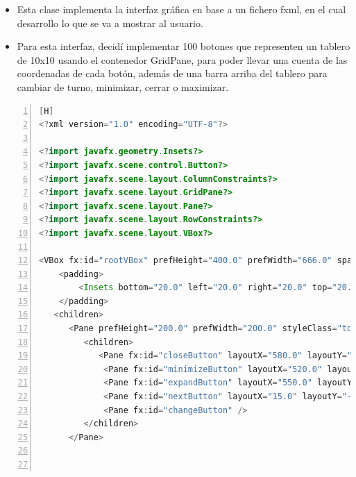 \documentclass{article}
\begin{document}
	\begin{itemize}	
		\item Esta clase implementa la interfaz gráfica en base a un fichero fxml, en el cual desarrollo lo que se va a mostrar al usuario.
		\item Para esta interfaz, decidí implementar 100 botones que representen un tablero de 10x10 usando el contenedor GridPane, para poder llevar una cuenta de las coordenadas de cada botón, además de una barra arriba del tablero para cambiar de turno, minimizar, cerrar o maximizar.
	\end{itemize}
	\begin{lstlisting}[language=java,caption={Archivo FXML}, numbers=left][H]
<?xml version="1.0" encoding="UTF-8"?>

<?import javafx.geometry.Insets?>
<?import javafx.scene.control.Button?>
<?import javafx.scene.layout.ColumnConstraints?>
<?import javafx.scene.layout.GridPane?>
<?import javafx.scene.layout.Pane?>
<?import javafx.scene.layout.RowConstraints?>
<?import javafx.scene.layout.VBox?>

<VBox fx:id="rootVBox" prefHeight="400.0" prefWidth="666.0" spacing="20.0" styleClass="vbox" stylesheets="@style.css" xmlns="http://javafx.com/javafx/21" xmlns:fx="http://javafx.com/fxml/1" fx:controller="com.example.lab22.HelloController">
    <padding>
        <Insets bottom="20.0" left="20.0" right="20.0" top="20.0" />
    </padding>
   <children>
      <Pane prefHeight="200.0" prefWidth="200.0" styleClass="toolBar">
         <children>
            <Pane fx:id="closeButton" layoutX="580.0" layoutY="-12.0" onMouseClicked="#handleCloseButton" />
             <Pane fx:id="minimizeButton" layoutX="520.0" layoutY="-12.0" onMouseClicked="#handleMinimizeButton" />
             <Pane fx:id="expandButton" layoutX="550.0" layoutY="-12.0" onMouseClicked="#handleExpandButton" />
             <Pane fx:id="nextButton" layoutX="15.0" layoutY="-12.0" onMouseClicked="#changeTurn" />
             <Pane fx:id="changeButton" />
         </children>
      </Pane>
       


\end{lstlisting}
\end{document}
